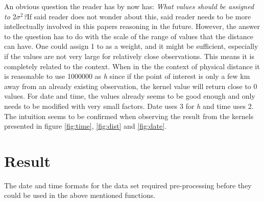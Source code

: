 \documentclass[a4paper, twocolumn]{article}
\begin{document}
	An obvious question the reader has by now has: \textit{What values should be assigned to \(2\sigma^2\)?}\newline If said reader does not wonder about this, said reader needs to be more intellectually involved in this papers reasoning in the future. However, the answer to the question has to do with the scale of the range of values that the distance can have. One could assign 1 to as a weight, and it might be sufficient, especially if the values are not very large for relatively close observations. This means it is completely related to the context. When in the the context of physical distance it is reasonable to use 1000000 as \textit{h} since if the point of interest is only a few km away from an already existing observation, the kernel value will return close to 0 values. For date and time, the values already seems to be good enough and only needs to be modified with very small factors. Date uses 3 for \textit{h} and time uses 2. The intuition seems to be confirmed when observing the result from the kernels presented in figure \ref{fig:time}, \ref{fig:dist} and \ref{fig:date}. 

    \section{Result}

    The date and time formats for the data set required pre-processing before they could be used in the above mentioned functions.
    
\end{document}
